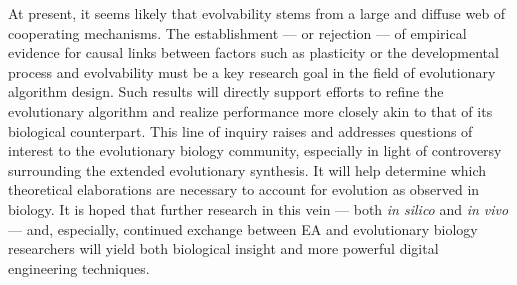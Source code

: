 At present, it seems likely that evolvability stems from a large and diffuse web of cooperating mechanisms. The establishment --- or rejection --- of empirical evidence for causal links between factors such as plasticity or the developmental process and evolvability must be a key research goal in the field of evolutionary algorithm design. Such results will directly support efforts to refine the evolutionary algorithm and realize performance more closely akin to that of its biological counterpart. This line of inquiry raises and addresses questions of interest to the evolutionary biology community, especially in light of controversy surrounding the extended evolutionary synthesis. It will help determine which theoretical elaborations are necessary to account for evolution as observed in biology. It is hoped that further research in this vein --- both \textit{in silico} and \textit{in vivo} --- and, especially, continued exchange between EA and evolutionary biology researchers will yield both biological insight and more powerful digital engineering techniques.